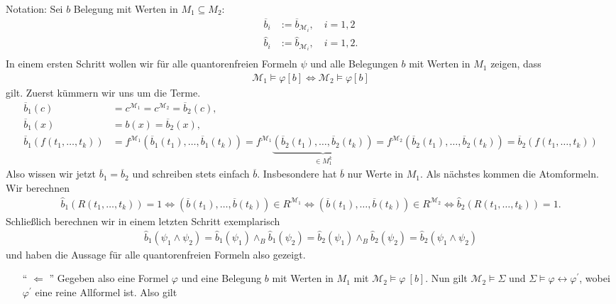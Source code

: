 \begin{solution}
  Notation: Sei $b$ Belegung mit Werten in $M_1 \subseteq M_2$:
  \begin{align*}
    \overline{b}_i &:= \overline{b}_{\mathscr{M}_i}, \quad i = 1,2 \\
    \hat{b}_i &:= \hat{b}_{\mathscr{M}_i}, \quad i = 1,2. \\
  \end{align*}
	In einem ersten Schritt wollen wir für alle quantorenfreien Formeln $\psi$ und alle Belegungen $b$ mit Werten in $M_1$ zeigen, dass
	\begin{align*}
	\mathscr{M}_1 \vDash \varphi[b] \iff \mathscr{M}_2 \vDash \varphi[b]
	\end{align*}
	gilt. Zuerst kümmern wir uns um die Terme.
	\begin{align*}
	\overline{b}_1(c) &= c^{\mathscr{M}_1} = c^{\mathscr{M}_2} = \overline{b}_2(c), \\
  \overline{b}_1(x) &= b(x) = \overline{b}_2(x), \\
	\overline{b}_1(f(t_1, \dots, t_k)) &= f^{\mathscr{M}_1}(\overline{b}_1(t_1), \dots, \overline{b}_1(t_k))
  = f^{\mathscr{M}_1}\underbrace{(\overline{b}_2(t_1), \dots, \overline{b}_2(t_k))}_{\in M_1^k} =
  f^{\mathscr{M}_2}(\overline{b}_2(t_1), \dots, \overline{b}_2(t_k))
  = \overline{b}_2(f(t_1, \dots, t_k))
	\end{align*}
	Also wissen wir jetzt $\overline{b}_1 = \overline{b}_2$ und schreiben stets einfach $\overline{b}$. Insbesondere hat $\overline{b}$ nur Werte in $M_1$. Als nächstes kommen die Atomformeln. Wir berechnen
	\begin{align*}
	\widehat{b}_1(R(t_1, \dots, t_k)) = 1 \Leftrightarrow (\overline{b}(t_1), \dots, \overline{b}(t_k)) \in R^{\mathscr{M}_1} \Leftrightarrow  (\overline{b}(t_1), \dots, \overline{b}(t_k)) \in R^{\mathscr{M}_2} \Leftrightarrow \widehat{b}_2(R(t_1, \dots, t_k)) = 1.
	\end{align*}
	Schließlich berechnen wir in einem letzten Schritt exemplarisch
	\begin{align*}
	\widehat{b}_1(\psi_1 \land \psi_2) = \widehat{b}_1(\psi_1) \land_B \widehat{b}_1 (\psi_2) = \widehat{b}_2(\psi_1) \land_B \widehat{b}_2(\psi_2) = \widehat{b}_2(\psi_1 \land \psi_2)
	\end{align*}
	und haben die Aussage für alle quantorenfreien Formeln also gezeigt.
	\begin{enumerate}
		\item[`` $\Leftarrow$ ''] Gegeben also eine Formel $\varphi$ und eine Belegung $b$ mit Werten in $M_1$ mit $\mathscr{M}_2 \vDash \varphi \ [b]$. Nun gilt $\mathscr{M}_2 \vDash \Sigma$ und $\Sigma \vDash \varphi \leftrightarrow \varphi^\prime$, wobei $\varphi^\prime$ eine reine Allformel ist. Also gilt

\end{enumerate}
\end{solution}
